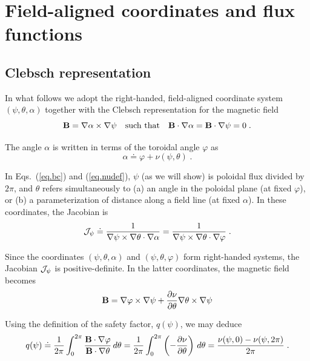 \section{Field-aligned coordinates and flux functions}
\label{sec.coord}
\subsection{Clebsch representation}

In what follows we adopt the right-handed, field-aligned 
coordinate system $(\psi,\theta,\alpha)$ together with the 
Clebsch representation \cite{kruskal:1958} for the magnetic 
field
%
\begin{equation}
{\bf B} = \nabla\alpha\times\nabla\psi
\quad\mbox{such that}\quad
{\bf B}\cdot\nabla\alpha = {\bf B}\cdot\nabla\psi = 0 
\label{eq.bc} \; .
\end{equation}

\noindent
The angle $\alpha$ is written in terms of the toroidal 
angle $\varphi$ as
%
\begin{equation}
\alpha \doteq \varphi + \nu(\psi,\theta)\; .
\label{eq.nudef}
\end{equation}

\noindent
In Eqs.~(\ref{eq.bc}) and (\ref{eq.nudef}), $\psi$ (as we will 
show) is poloidal flux divided by $2\pi$, and $\theta$ refers 
simultaneously to (a) 
an angle in the poloidal plane (at fixed $\varphi$), or 
(b) a parameterization of distance along a field line 
(at fixed $\alpha$). In these coordinates, the Jacobian is 
%
\begin{equation}
{\mathcal J}_\psi \doteq \frac{1}{\nabla\psi\times\nabla\theta\cdot\nabla\alpha}
= \frac{1}{\nabla\psi\times\nabla\theta\cdot\nabla\varphi} \; . 
\label{eq.jacpsi}
\end{equation}

\noindent
Since the coordinates $(\psi,\theta,\alpha)$ and 
$(\psi,\theta,\varphi)$ form right-handed systems, 
the Jacobian ${\mathcal J}_\psi$ is positive-definite.  In the latter 
coordinates, the magnetic field becomes
%
\begin{equation}
{\bf B} = \nabla\varphi\times\nabla\psi + 
\frac{\partial \nu}{\partial \theta} \nabla\theta\times\nabla\psi
\label{eq.bsalpha}
\end{equation}

\noindent 
Using the definition of the safety factor, $q(\psi)$, we 
may deduce
%
\begin{equation}
q(\psi) \doteq \frac{1}{2\pi} \int_0^{2\pi}  
\frac{{\bf B}\cdot\nabla\varphi}{{\bf B}\cdot\nabla\theta} \, d\theta 
= \frac{1}{2\pi} \int_0^{2\pi} 
   \left( -\frac{\partial \nu}{\partial \theta} \right) \, d\theta
= \frac{\nu(\psi,0)-\nu(\psi,2\pi)}{2\pi} \; .
\end{equation}

